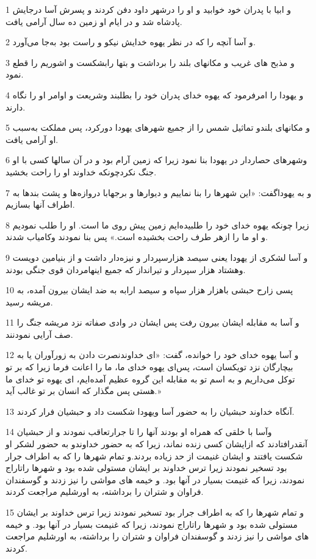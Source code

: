 \par 1 و ابیا با پدران خود خوابید و او را درشهر داود دفن کردند و پسرش آسا درجایش پادشاه شد و در ایام او زمین ده سال آرامی یافت.
\par 2 و آسا آنچه را که در نظر یهوه خدایش نیکو و راست بود به‌جا می‌آورد.
\par 3 و مذبح های غریب و مکانهای بلند را برداشت و بتها رابشکست و اشوریم را قطع نمود.
\par 4 و یهودا را امرفرمود که یهوه خدای پدران خود را بطلبند وشریعت و اوامر او را نگاه دارند.
\par 5 و مکانهای بلندو تماثیل شمس را از جمیع شهرهای یهودا دورکرد، پس مملکت به‌سبب او آرامی یافت.
\par 6 وشهرهای حصاردار در یهودا بنا نمود زیرا که زمین آرام بود و در آن سالها کسی با او جنگ نکردچونکه خداوند او را راحت بخشید.
\par 7 و به یهوداگفت: «این شهرها را بنا نماییم و دیوارها و برجهابا دروازه‌ها و پشت بندها به اطراف آنها بسازیم.
\par 8 زیرا چونکه یهوه خدای خود را طلبیده‌ایم زمین پیش روی ما است. او را طلب نمودیم و او ما را ازهر طرف راحت بخشیده است.» پس بنا نمودند وکامیاب شدند.
\par 9 و آسا لشکری از یهودا یعنی سیصد هزارسپردار و نیزه‌دار داشت و از بنیامین دویست وهشتاد هزار سپردار و تیرانداز که جمیع اینهامردان قوی جنگی بودند.
\par 10 پسی زارح حبشی باهزار هزار سپاه و سیصد ارابه به ضد ایشان بیرون آمده، به مریشه رسید.
\par 11 و آسا به مقابله ایشان بیرون رفت پس ایشان در وادی صفاته نزد مریشه جنگ را صف آرایی نمودنند. 
\par 12 و آسا یهوه خدای خود را خوانده، گفت: «ای خداوندنصرت دادن به زورآوران یا به بیچارگان نزد تویکسان است، پس‌ای یهوه خدای ما، ما را اعانت فرما زیرا که بر تو توکل می‌داریم و به اسم تو به مقابله این گروه عظیم آمده‌ایم، ای یهوه تو خدای ما هستی پس مگذار که انسان بر تو غالب آید.»
\par 13 آنگاه خداوند حبشیان را به حضور آسا ویهودا شکست داد و حبشیان فرار کردند.
\par 14 وآسا با خلقی که همراه او بودند آنها را تا جرارتعاقب نمودند و از حبشیان آنقدر‌افتادند که ازایشان کسی زنده نماند، زیرا که به حضور خداوندو به حضور لشکر او شکست یافتند و ایشان غنیمت از حد زیاده بردند.و تمام شهرها را که به اطراف جرار بود تسخیر نمودند زیرا ترس خداوند بر ایشان مستولی شده بود و شهرها راتاراج نمودند، زیرا که غنیمت بسیار در آنها بود. و خیمه های مواشی را نیز زدند و گوسفندان فراوان و شتران را برداشته، به اورشلیم مراجعت کردند.
\par 15 و تمام شهرها را که به اطراف جرار بود تسخیر نمودند زیرا ترس خداوند بر ایشان مستولی شده بود و شهرها راتاراج نمودند، زیرا که غنیمت بسیار در آنها بود. و خیمه های مواشی را نیز زدند و گوسفندان فراوان و شتران را برداشته، به اورشلیم مراجعت کردند.
 
